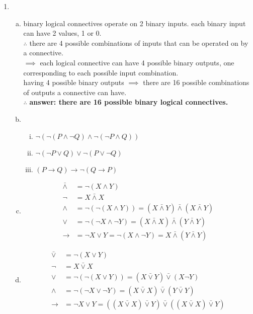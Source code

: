 \documentclass{article}
\begin{document}
\begin{enumerate}
  \item
        \begin{enumerate}[(a)]
            \item
                binary logical connectives operate on 2 binary inputs. each binary input can have 2 values, 1 or 0.\\ \(\therefore\) there are 4 possible combinations of inputs that can be operated on by a connective.\\ \(\implies\) each logical connective can have 4 possible binary outputs, one corresponding to each possible input combination.\\ having 4 possible binary outputs \(\implies\) there are 16 possible combinations of outputs a connective can have.\\ \(\therefore\) \textbf{answer: there are 16 possible binary logical connectives.}
          \item
                \begin{enumerate}[(i)]
                  \item
                        \(\lnot(\lnot(P\land\lnot Q)\land\lnot(\lnot P\land Q))\)
                  \item
                        \(\lnot(\lnot P\lor Q)\lor\lnot(P\lor\lnot Q)\)
                  \item
                        \((P\to Q)\to\lnot(Q\to P)\)
                \end{enumerate}
                  \item
                        \def\lnand{\bar\land}
                        \begin{align}
                          \lnand&=\lnot(X\land Y)\\
                          \lnot&=X\lnand X\\
                          \land&=\lnot(\lnot(X\land Y))=(X\lnand Y)\lnand (X\lnand Y)\\
                          \lor&=\lnot(\lnot X\land\lnot Y)=(X\lnand X)\lnand(Y\lnand Y)\\
                          \to&=\lnot X\lor Y=\lnot(X\land\lnot Y)=X\lnand(Y\lnand Y)
          \end{align}
                  \item
                        \def\lnor{\bar\lor}
                        \begin{align}
                          \lnor&=\lnot(X\lor Y)\\
                          \lnot&=X\lnor X\\
                          \lor&=\lnot(\lnot(X\lor Y))=(X\lnor Y)\lnor (X\lnot Y)\\
                          \land&=\lnot(\lnot X\lor\lnot Y)=(X\lnor X)\lnor(Y\lnor Y)\\
                          \to&=\lnot X\lor Y=((X\lnor X)\lnor Y)\lnor((X\lnor X)\lnor Y)
          \end{align}


\end{enumerate}
\end{enumerate}
\end{document}
